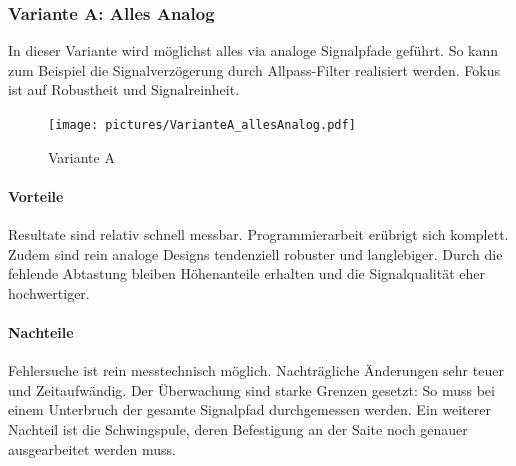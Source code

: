 \subsubsection{Variante A: Alles Analog}
In dieser Variante wird möglichst alles via analoge Signalpfade geführt. So kann zum Beispiel die Signalverzögerung durch Allpass-Filter realisiert werden. Fokus ist auf Robustheit und Signalreinheit.
\begin{figure}[H]
	\centering
	\texttt{[image: pictures/VarianteA\_allesAnalog.pdf]}
	\caption{Variante A}
\end{figure}
\paragraph{Vorteile} Resultate sind relativ schnell messbar. Programmierarbeit erübrigt sich komplett. Zudem sind rein analoge Designs tendenziell robuster und langlebiger. Durch die fehlende Abtastung bleiben Höhenanteile erhalten und die Signalqualität eher hochwertiger.
\paragraph{Nachteile} Fehlersuche ist rein messtechnisch möglich. Nachträgliche Änderungen sehr teuer und Zeitaufwändig. Der Überwachung sind starke Grenzen gesetzt: So muss bei einem Unterbruch der gesamte Signalpfad durchgemessen werden. Ein weiterer Nachteil ist die Schwingspule, deren Befestigung an der Saite noch genauer ausgearbeitet werden muss.
\newpage

